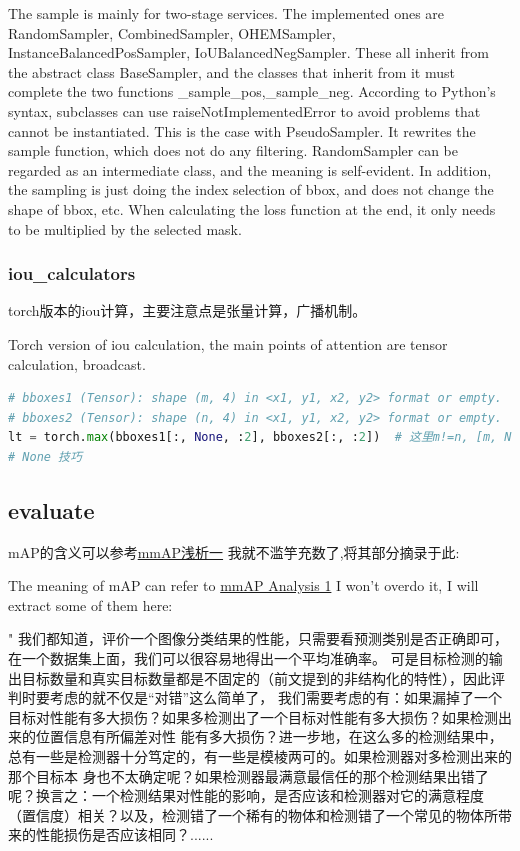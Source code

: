 \documentclass[UTF8]{ctexart}
\begin{document}
The sample is mainly for two-stage services. The implemented ones are RandomSampler, CombinedSampler, 
OHEMSampler, InstanceBalancedPosSampler, IoUBalancedNegSampler. These all inherit 
from the abstract class BaseSampler, and the classes that inherit from it must complete 
the two functions \_sample\_pos,\_sample\_neg. According to Python's syntax, subclasses can use 
raiseNotImplementedError to avoid problems that cannot be instantiated. This is the case with 
PseudoSampler. It rewrites the sample function, which does not do any filtering. RandomSampler 
can be regarded as an intermediate class, and the meaning is self-evident. In addition, 
the sampling is just doing the index selection of bbox, and does not change the shape of bbox, etc. 
When calculating the loss function at the end, it only needs to be multiplied by the selected mask.

\subsubsection{iou\_calculators}
torch版本的iou计算，主要注意点是张量计算，广播机制。

Torch version of iou calculation, the main points of attention are tensor calculation, broadcast.

\lstset{style=mystyle}
\begin{lstlisting}[language=Python]
# bboxes1 (Tensor): shape (m, 4) in <x1, y1, x2, y2> format or empty.
# bboxes2 (Tensor): shape (n, 4) in <x1, y1, x2, y2> format or empty.
lt = torch.max(bboxes1[:, None, :2], bboxes2[:, :2])  # 这里m!=n, [m, None, 2] + [n, 2] --> [m, n, 2] 
# None 技巧
\end{lstlisting}

\subsection{evaluate}
mAP的含义可以参考\href{https://zhuanlan.zhihu.com/p/55575423}{mmAP浅析一}
我就不滥竽充数了,将其部分摘录于此:

The meaning of mAP can refer to \href{https://zhuanlan.zhihu.com/p/55575423}{mmAP Analysis 1}
I won't overdo it, I will extract some of them here:

"
我们都知道，评价一个图像分类结果的性能，只需要看预测类别是否正确即可，在一个数据集上面，我们可以很容易地得出一个平均准确率。
可是目标检测的输出目标数量和真实目标数量都是不固定的（前文提到的非结构化的特性），因此评判时要考虑的就不仅是“对错”这么简单了，
我们需要考虑的有：如果漏掉了一个目标对性能有多大损伤？如果多检测出了一个目标对性能有多大损伤？如果检测出来的位置信息有所偏差对性
能有多大损伤？进一步地，在这么多的检测结果中，总有一些是检测器十分笃定的，有一些是模棱两可的。如果检测器对多检测出来的那个目标本
身也不太确定呢？如果检测器最满意最信任的那个检测结果出错了呢？换言之：一个检测结果对性能的影响，是否应该和检测器对它的满意程度
（置信度）相关？以及，检测错了一个稀有的物体和检测错了一个常见的物体所带来的性能损伤是否应该相同？......
\end{document}
